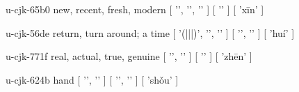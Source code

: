 \begin{multicols}{2}
\lettrine[lines=3]{\cjkgGlue{}}{}\begin{minipage}{0.8\linewidth} u-cjk-65b0  new, recent, fresh, modern  [ '\cjkgGlue{}', '\cjkgGlue{}', '\cjkgGlue{}' ]  [ '\cjkgGlue{}' ]  [ 'xīn' ] \end{minipage}

\lettrine[lines=3]{\cjkgGlue{}}{}\begin{minipage}{0.8\linewidth} u-cjk-56de  return, turn around; a time  [ '\cjkgGlue{}(\cjkgGlue{}|\cjkgGlue{}|\cjkgGlue{}|\cjkgGlue{})', '\cjkgGlue{}', '\cjkgGlue{}' ]  [ '\cjkgGlue{}', '\cjkgGlue{}' ]  [ 'huí' ] \end{minipage}

\lettrine[lines=3]{\cjkgGlue{}}{}\begin{minipage}{0.8\linewidth} u-cjk-771f  real, actual, true, genuine  [ '\cjkgGlue{}', '\cjkgGlue{}' ]  [ '\cjkgGlue{}' ]  [ 'zhēn' ] \end{minipage}

\lettrine[lines=3]{\cjkgGlue{}}{}\begin{minipage}{0.8\linewidth} u-cjk-624b  hand  [ '\cjkgGlue{}', '\cjkgGlue{}' ]  [ '\cjkgGlue{}', '\cjkgGlue{}' ]  [ 'shǒu' ] \end{minipage}


\end{multicols}
